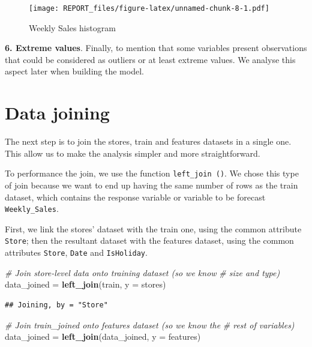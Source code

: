 \documentclass[11pt,]{article}
\newenvironment{Shaded}{\begin{snugshade}}{\end{snugshade}}
\newcommand{\KeywordTok}[1]{\textcolor[rgb]{0.13,0.29,0.53}{\textbf{{#1}}}}
\newcommand{\DataTypeTok}[1]{\textcolor[rgb]{0.13,0.29,0.53}{{#1}}}
\newcommand{\StringTok}[1]{\textcolor[rgb]{0.31,0.60,0.02}{{#1}}}
\newcommand{\CommentTok}[1]{\textcolor[rgb]{0.56,0.35,0.01}{\textit{{#1}}}}
\newcommand{\NormalTok}[1]{{#1}}
\begin{document}
\begin{figure}[htbp]
\centering
\texttt{[image: REPORT\_files/figure-latex/unnamed-chunk-8-1.pdf]}
\caption{Weekly Sales histogram}
\end{figure}

\textbf{6. Extreme values}. Finally, to mention that some variables
present observations that could be considered as outliers or at least
extreme values. We analyse this aspect later when building the model.

\section{Data joining}\label{data-joining}

The next step is to join the stores, train and features datasets in a
single one. This allow us to make the analysis simpler and more
straightforward.

To performance the join, we use the function \texttt{left\_join\ ()}. We
chose this type of join because we want to end up having the same number
of rows as the train dataset, which contains the response variable or
variable to be forecast \texttt{Weekly\_Sales}.

First, we link the stores' dataset with the train one, using the common
attribute \texttt{Store}; then the resultant dataset with the features
dataset, using the common attributes \texttt{Store}, \texttt{Date} and
\texttt{IsHoliday}.

\begin{Shaded}
\begin{Highlighting}[]
\CommentTok{# Join store-level data onto training dataset (so we know}
\CommentTok{# size and type)}
\NormalTok{data_joined =}\StringTok{ }\KeywordTok{left_join}\NormalTok{(train, }\DataTypeTok{y =} \NormalTok{stores)}
\end{Highlighting}
\end{Shaded}

\begin{verbatim}
## Joining, by = "Store"
\end{verbatim}

\begin{Shaded}
\begin{Highlighting}[]
\CommentTok{# Join train_joined onto features dataset (so we know the}
\CommentTok{# rest of variables)}
\NormalTok{data_joined =}\StringTok{ }\KeywordTok{left_join}\NormalTok{(data_joined, }\DataTypeTok{y =} \NormalTok{features)}
\end{Highlighting}
\end{Shaded}
\end{document}
